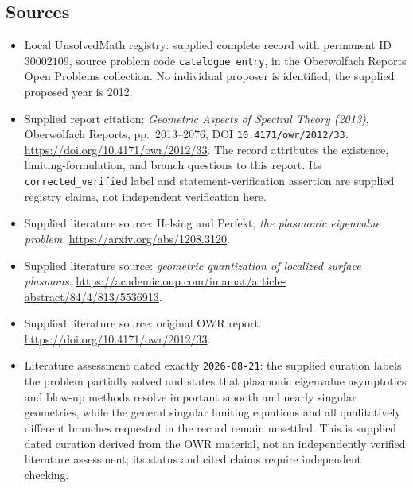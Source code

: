 \documentclass[11pt]{article}
\begin{document}
\subsection{Sources}
\begin{itemize}
\item Local UnsolvedMath registry: supplied complete record with permanent ID \(30002109\), source problem code \texttt{catalogue entry}, in the Oberwolfach Reports Open Problems collection. No individual proposer is identified; the supplied proposed year is 2012.
\item Supplied report citation: \emph{Geometric Aspects of Spectral Theory (2013)}, Oberwolfach Reports, pp.~2013--2076, DOI \texttt{10.4171/owr/2012/33}. \url{https://doi.org/10.4171/owr/2012/33}. The record attributes the existence, limiting-formulation, and branch questions to this report. Its \texttt{corrected\_verified} label and statement-verification assertion are supplied registry claims, not independent verification here.
\item Supplied literature source: Helsing and Perfekt, \emph{the plasmonic eigenvalue problem}. \url{https://arxiv.org/abs/1208.3120}.
\item Supplied literature source: \emph{geometric quantization of localized surface plasmons}. \url{https://academic.oup.com/imamat/article-abstract/84/4/813/5536913}.
\item Supplied literature source: original OWR report. \url{https://doi.org/10.4171/owr/2012/33}.
\item Literature assessment dated exactly \texttt{2026-08-21}: the supplied curation labels the problem partially solved and states that plasmonic eigenvalue asymptotics and blow-up methods resolve important smooth and nearly singular geometries, while the general singular limiting equations and all qualitatively different branches requested in the record remain unsettled. This is supplied dated curation derived from the OWR material, not an independently verified literature assessment; its status and cited claims require independent checking.
\end{itemize}
\end{document}

